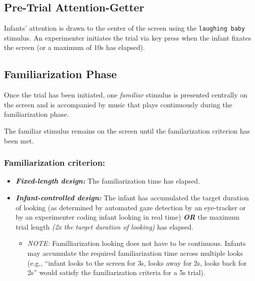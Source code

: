 \documentclass[
  letterpaper,
  DIV=11,
  numbers=noendperiod,
  oneside]{scrreprt}
\providecommand{\tightlist}{%
  \setlength{\itemsep}{0pt}\setlength{\parskip}{0pt}}
\begin{document}
\subsection{Pre-Trial
Attention-Getter}\label{pre-trial-attention-getter}

Infants' attention is drawn to the center of the screen using the
\texttt{laughing\ baby} stimulus. An experimenter initiates the trial
via key press when the infant fixates the screen (or a maximum of 10s
has elapsed).

\subsection{Familiarization Phase}\label{sec-famphase}

Once the trial has been initiated, one \emph{familiar} stimulus is
presented centrally on the screen and is accompanied by music that plays
continuously during the familiarization phase.

The familiar stimulus remains on the screen until the familarization
criterion has been met.

\subsubsection{Familiarization
criterion:}\label{familiarization-criterion}

\begin{itemize}
\tightlist
\item
  \textbf{\emph{Fixed-length design:}} The familiarization time has
  elapsed.
\item
  \textbf{\emph{Infant-controlled design:}} The infant has accumulated
  the target duration of looking (as determined by automated gaze
  detection by an eye-tracker or by an experimenter coding infant
  looking in real time) \textbf{\emph{OR}} the maximum trial length
  \emph{(2x the target duration of looking)} has elapsed.

  \begin{itemize}
  \tightlist
  \item
    \emph{NOTE:} Familliarization looking does not have to be
    continuous. Infants may accumulate the required familiarization time
    across multiple looks (e.g., ``infant looks to the screen for 3s,
    looks away for 2s, looks back for 2s'' would satisfy the
    familiarization criteria for a 5s trial).
  \end{itemize}
\end{itemize}
\end{document}
